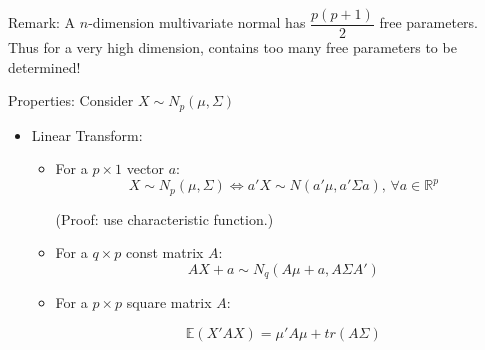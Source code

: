     
    

    Remark: A $ n $-dimension multivariate normal has $ \dfrac{p(p+1)}{2} $ free parameters. Thus for a very high dimension, contains too many free parameters to be determined! 
    
    Properties: Consider $ X\sim N_p(\mu,\Sigma) $
    \begin{itemize}[topsep=6pt,itemsep=4pt]
        \item Linear Transform:
        \begin{itemize}[topsep=6pt,itemsep=4pt]       
        \item For a $ p\times 1 $ vector $ a $:
        \begin{equation}
            X\sim N_p(\mu,\Sigma )\Leftrightarrow a'X\sim N(a'\mu,a'\Sigma a),\,\forall a\in\mathbb{R}^p 
        \end{equation}

        (Proof: use characteristic function.)
        
        \item For a $ q\times p $ const matrix $ A $:
        \begin{equation}\label{EqaTransformOfMultiNormal}
            AX+a\sim N_q(A\mu+a,A\Sigma  A')
        \end{equation}
        \item For a $ p\times p    $ square matrix $ A $:
        
        \begin{equation}\label{EqaExpectationOfQuadric}
            \mathbb{E}(X'AX)= \mu'A\mu +tr(A\Sigma )            
        \end{equation}
        

\end{itemize}
\end{itemize}
